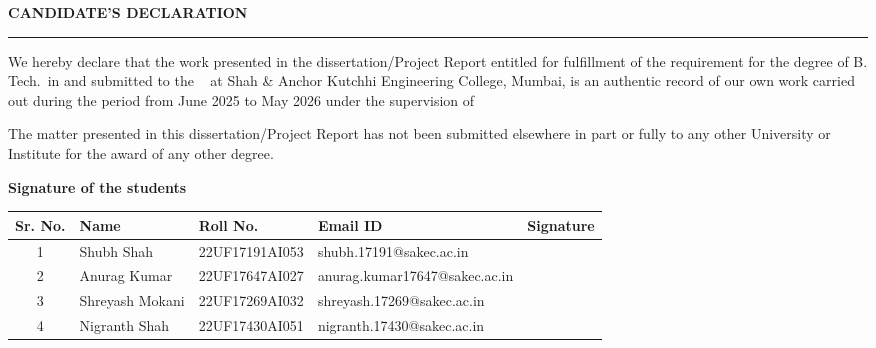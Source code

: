 \thispagestyle{empty}

\begin{center}
{\Large {\bf \uppercase{Candidate's Declaration}}}
\end{center}

\vspace{\baselineskip}
\hrule
\vspace{2\baselineskip}

We hereby declare that the work presented in the dissertation/Project Report entitled {{\mytitle}} for fulfillment of the requirement for the degree of B. Tech.\ in \branch and submitted to the \mydep~ at Shah \& Anchor Kutchhi Engineering College, Mumbai, is an authentic record of our own work carried out during the period from June 2025 to May 2026 under the supervision of {\mysupervisor} \par
\vspace{2\baselineskip}
The matter presented in this dissertation/Project Report has not been submitted elsewhere in part or fully to any other University or Institute for the award of any other degree.


\bigskip


\bigskip


\bigskip

{\textbf{Signature of the students \ \ \ \ \ \ }}

  \begin{table}[htbp]
\centering
\begin{tabular}{|c|l|l|l|l|}
\hline
\textbf{Sr. No.} & \textbf{Name} & \textbf{Roll No.} & \textbf{Email ID}  & Signature\\ \hline
1 & Shubh Shah& 22UF17191AI053& shubh.17191@sakec.ac.in&\\ \hline
2 & Anurag Kumar& 22UF17647AI027& anurag.kumar17647@sakec.ac.in&\\ \hline
3 & Shreyash Mokani& 22UF17269AI032& shreyash.17269@sakec.ac.in&\\ \hline
4 & Nigranth Shah& 22UF17430AI051& nigranth.17430@sakec.ac.in&\\ \hline
\end{tabular}
\end{table}